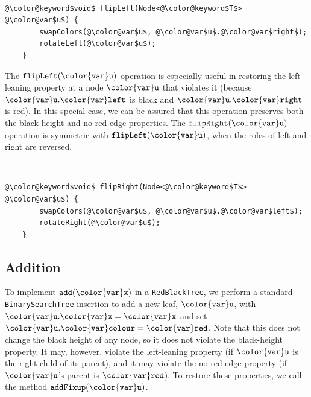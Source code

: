 \documentclass[10pt]{book}
\theoremstyle{plain}
\theoremstyle{definition}
\begin{document}
 \ \vspace{.5ex}\begin{Verbatim}[gobble=1,tabsize=2,frame=single,framerule=1.2pt,commandchars=\\@\$,label=\texttt{RedBlackTree},labelposition=topline]
	@\color@keyword$void$ flipLeft(Node<@\color@keyword$T$> @\color@var$u$) {
		swapColors(@\color@var$u$, @\color@var$u$.@\color@var$right$);
		rotateLeft(@\color@var$u$);
	}
\end{Verbatim}

The \ensuremath{\mathtt{flipLeft({\color{var}u})}} operation
is especially useful in restoring the left-leaning property at a node
\ensuremath{\mathtt{{\color{var}u}}} that violates it (because \ensuremath{\mathtt{{\color{var}u}.{\color{var}left}}} is black and \ensuremath{\mathtt{{\color{var}u}.{\color{var}right}}} is red).
In this special case, we can be assured that this operation preserves both
the black-height and no-red-edge properties.  The \ensuremath{\mathtt{flipRight({\color{var}u})}} operation
is symmetric with \ensuremath{\mathtt{flipLeft({\color{var}u})}}, when the roles of left and right are reversed.


 \ \vspace{.5ex}\begin{Verbatim}[gobble=1,tabsize=2,frame=single,framerule=1.2pt,commandchars=\\@\$,label=\texttt{RedBlackTree},labelposition=topline]
	@\color@keyword$void$ flipRight(Node<@\color@keyword$T$> @\color@var$u$) {
		swapColors(@\color@var$u$, @\color@var$u$.@\color@var$left$);
		rotateRight(@\color@var$u$);
	}
\end{Verbatim}


\subsection{Addition}

To implement \ensuremath{\mathtt{add({\color{var}x})}} in a \texttt{RedBlackTree}, we perform a standard
\texttt{BinarySearchTree} insertion to add a new leaf, \ensuremath{\mathtt{{\color{var}u}}}, with $\ensuremath{\mathtt{{\color{var}u}.{\color{var}x}}}=\ensuremath{\mathtt{{\color{var}x}}}$ and
set $\ensuremath{\mathtt{{\color{var}u}.{\color{var}colour}}}=\ensuremath{\mathtt{{\color{var}red}}}$.  Note that this does not change the black height
of any node, so it does not violate the black-height property.  It may,
however, violate the left-leaning property (if \ensuremath{\mathtt{{\color{var}u}}} is the right child of
its parent), and it may violate the no-red-edge property (if \ensuremath{\mathtt{{\color{var}u}}}'s parent
is \ensuremath{\mathtt{{\color{var}red}}}).  To restore these properties, we call the method \ensuremath{\mathtt{addFixup({\color{var}u})}}.
\end{document}
